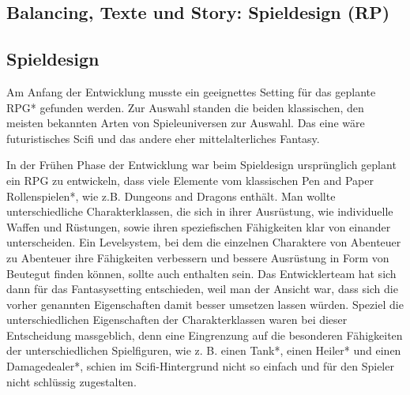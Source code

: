 

\subsection{Balancing, Texte und Story: Spieldesign (RP)}



\subsection{Spieldesign} Am Anfang der Entwicklung musste ein geeignettes Setting für das geplante RPG* gefunden werden. Zur Auswahl standen die beiden klassischen, den meisten bekannten Arten von Spieleuniversen zur Auswahl. Das eine wäre futuristisches Scifi und das andere eher mittelalterliches Fantasy. 

In der Frühen Phase der Entwicklung war beim Spieldesign ursprünglich geplant ein RPG zu entwickeln, dass viele Elemente vom klassischen Pen and Paper Rollenspielen*, wie z.B. Dungeons and Dragons enthält. Man wollte unterschiedliche Charakterklassen, die sich in ihrer Ausrüstung, wie individuelle Waffen und Rüstungen, sowie ihren speziefischen Fähigkeiten klar von einander unterscheiden. Ein Levelsystem, bei dem die einzelnen Charaktere von Abenteuer zu Abenteuer ihre Fähigkeiten verbessern und bessere Ausrüstung in Form von Beutegut finden können, sollte auch enthalten sein. Das Entwicklerteam hat sich dann für das Fantasysetting entschieden, weil man der Ansicht war, dass sich die vorher genannten Eigenschaften damit besser umsetzen lassen würden. Speziel die unterschiedlichen Eigenschaften der Charakterklassen waren bei dieser Entscheidung massgeblich, denn eine Eingrenzung auf die besonderen Fähigkeiten der unterschiedlichen Spielfiguren, wie z. B. einen Tank*, einen Heiler* und einen Damagedealer*, schien im Scifi-Hintergrund nicht so einfach und für den Spieler nicht schlüssig zugestalten.

